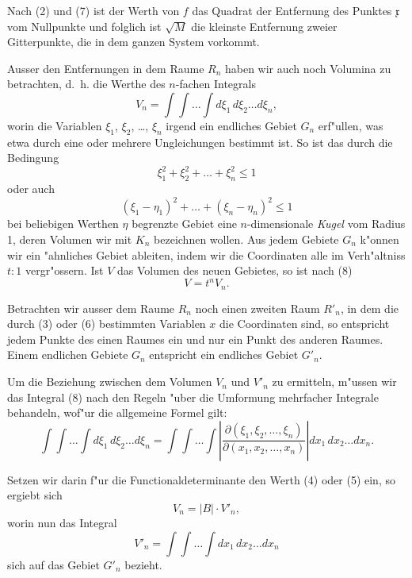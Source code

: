 \documentclass[12pt,a4paper]{article}
\theoremstyle{definition}
\begin{document}
Nach (2) und (7) ist der Werth von $f$ das Quadrat der Entfernung des Punktes $\mathfrak{x}$ vom Nullpunkte und folglich ist $\sqrt{M}$ die kleinste Entfernung zweier Gitterpunkte, die in dem ganzen System vorkommt.

Ausser den Entfernungen in dem Raume $R_n$ haben wir auch noch Volumina zu betrachten, d.~h. die Werthe des $n$-fachen Integrals
\begin{equation}
V_n = \int \int \dots \int d\xi_1 \, d\xi_2 \dots d\xi_n,
\end{equation}
worin die Variablen $\xi_1$, $\xi_2$, \dots, $\xi_n$ irgend ein endliches Gebiet $G_n$ erf"ullen, was etwa durch eine oder mehrere Ungleichungen bestimmt ist. So ist das durch die Bedingung
\begin{equation}
\xi_1^2 + \xi_2^2 + \dots + \xi_n^2 \leq 1
\end{equation}
oder auch
\begin{equation}
(\xi_1 - \eta_1)^2 + \dots + (\xi_n - \eta_n)^2 \leq 1
\end{equation}
bei beliebigen Werthen $\eta$ begrenzte Gebiet eine $n$-dimensionale \emph{Kugel} vom Radius 1, deren Volumen wir mit $K_n$ bezeichnen wollen. Aus jedem Gebiete $G_n$ k"onnen wir ein "ahnliches Gebiet ableiten, indem wir die Coordinaten alle im Verh"altniss $t : 1$ vergr"ossern. Ist $V$ das Volumen des neuen Gebietes, so ist nach (8)
\begin{equation}
V = t^n V_n.
\end{equation}

Betrachten wir ausser dem Raume $R_n$ noch einen zweiten Raum $R'_n$, in dem die durch (3) oder (6) bestimmten Variablen $x$ die Coordinaten sind, so entspricht jedem Punkte des einen Raumes ein und nur ein Punkt des anderen Raumes. Einem endlichen Gebiete $G_n$ entspricht ein endliches Gebiet $G'_n$.

Um die Beziehung zwischen dem Volumen $V_n$ und $V'_n$ zu ermitteln, m"ussen wir das Integral (8) nach den Regeln "uber die Umformung mehrfacher Integrale behandeln, wof"ur die allgemeine Formel gilt:
\begin{equation}
\int\!\!\int\!\dots\!\int d\xi_1 \, d\xi_2 \dots d\xi_n = \int\!\!\int\!\dots\!\int \left|\frac{\partial(\xi_1, \xi_2, \dots, \xi_n)}{\partial(x_1, x_2, \dots, x_n)}\right| dx_1 \, dx_2 \dots dx_n.
\end{equation}

Setzen wir darin f"ur die Functionaldeterminante den Werth (4) oder (5) ein, so ergiebt sich
\begin{equation}
V_n = |B| \cdot V'_n,
\end{equation}
worin nun das Integral
\begin{equation}
V'_n = \int\!\!\int\!\dots\!\int dx_1 \, dx_2 \dots dx_n
\end{equation}
sich auf das Gebiet $G'_n$ bezieht.
\end{document}

